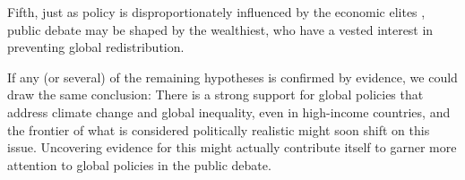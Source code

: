 Fifth, just as policy is disproportionately influenced by the economic elites \citep{gilens_testing_2014,persson_rich_2023}, public debate may be shaped by the wealthiest, who have a vested interest in preventing global redistribution. 

If any (or several) of the remaining hypotheses is confirmed by evidence, we could draw the same conclusion: %
There is a strong support for global policies that address climate change and global inequality, even in high-income countries, and the frontier of what is considered politically realistic might soon shift on this issue. Uncovering evidence for this might actually contribute itself to garner more attention to global policies in the public debate. %


